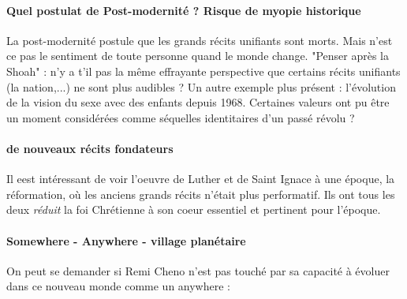 \paragraph{Quel postulat de Post-modernité ? Risque de myopie historique} La post-modernité postule que les grands récits unifiants sont morts. Mais n'est ce pas le sentiment de toute personne quand le monde change. "Penser après la Shoah" : n'y a t'il pas la même effrayante perspective que certains récits unifiants (la nation,...) ne sont plus audibles ? Un autre exemple plus présent : l'évolution de la vision du sexe avec des enfants depuis 1968. Certaines valeurs ont pu être un moment considérées comme séquelles identitaires d'un passé révolu ? 

\paragraph{de nouveaux récits fondateurs} Il eest intéressant de voir l'oeuvre de Luther et de Saint Ignace à une époque, la réformation, où les anciens grands récits n'était plus performatif. Ils ont tous les deux \textit{réduit} la foi Chrétienne à son coeur essentiel et pertinent pour l'époque.

\paragraph{Somewhere - Anywhere - village planétaire} On peut se demander si Remi Cheno n'est pas touché par sa capacité à évoluer dans ce nouveau monde comme un anywhere : 

